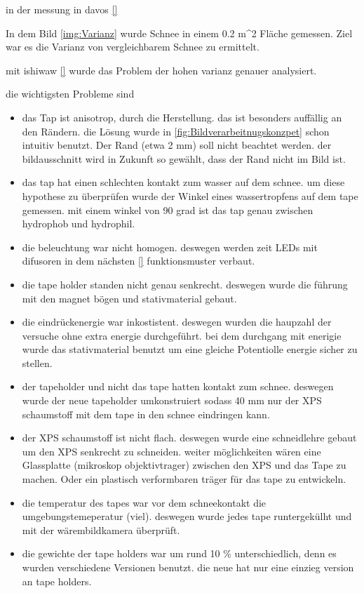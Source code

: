 in der messung in davos \ref{}

In dem Bild \ref{img:Varianz} wurde Schnee in einem 0.2 m^2 Fläche gemessen. Ziel war es die Varianz von vergleichbarem Schnee zu ermittelt.

mit ishiwaw \ref{} wurde das Problem der hohen varianz genauer analysiert.

die wichtigsten Probleme sind
\begin{itemize}
\item das Tap ist anisotrop, durch die Herstellung. das ist besonders auffällig an den Rändern. die Lösung wurde in \ref{fig:Bildverarbeitnugskonzpet} schon intuitiv benutzt. Der Rand (etwa 2 mm) soll nicht beachtet werden. der bildausschnitt wird in Zukunft so gewählt, dass der Rand nicht im Bild ist.
\item das tap hat einen schlechten kontakt zum wasser auf dem schnee. um diese hypothese zu überprüfen wurde der Winkel eines wassertropfens auf dem tape gemessen. mit einem winkel von 90 grad ist das tap genau zwischen hydrophob und hydrophil.
\item die beleuchtung war nicht homogen. deswegen werden zeit LEDs mit difusoren in dem nächsten \ref{} funktionsmuster verbaut.
\item die tape holder standen nicht genau senkrecht. deswegen wurde die führung mit den magnet bögen und stativmaterial gebaut.
\item die eindrückenergie war inkostistent. deswegen wurden die haupzahl der versuche ohne extra energie durchgeführt. bei dem durchgang mit enerigie wurde das stativmaterial benutzt um eine gleiche Potentiolle energie sicher zu stellen.
\item der tapeholder und nicht das tape hatten kontakt zum schnee. deswegen wurde der neue tapeholder umkonstruiert sodass 40 mm nur der XPS schaumstoff mit dem tape in den schnee eindringen kann.
\item der XPS schaumstoff ist nicht flach. deswegen wurde eine schneidlehre gebaut um den XPS senkrecht  zu schneiden. weiter möglichkeiten wären eine Glassplatte (mikroskop objektivtrager) zwischen den XPS und das Tape zu machen. Oder ein plastisch verformbaren träger für das tape zu entwickeln.
\item die temperatur des tapes war vor dem schneekontakt die umgebungstemeperatur (viel). deswegen wurde jedes tape runtergekülht und mit der wärembildkamera überprüft.
\item die gewichte der tape holders war um rund 10 \% unterschiedlich, denn es wurden verschiedene Versionen benutzt. die neue hat nur eine einzieg version an tape holders.

\end{itemize}
